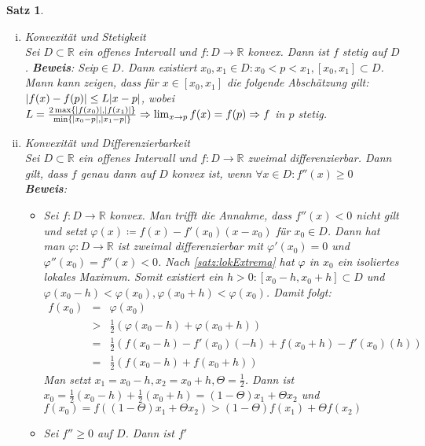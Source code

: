 \documentclass[ngerman,titlepage,twoside, parskip=half*]{scrreprt}
\newcommand*{\R}{\mathbb{R}}
\theoremstyle{break}
\newtheorem{theorem}{Satz}[section]
\theoremstyle{nonumberbreak}
\DeclarePairedDelimiter{\abs}{\lvert}{\rvert}
\begin{document}
\begin{theorem}
  \begin{enumerate}[(i)]
    \item \textit{Konvexität und Stetigkeit}\\
      Sei $D\subset\R$ ein offenes Intervall und $f\colon D\rightarrow\R$
      konvex. Dann ist $f$ stetig auf $D$.
      \textbf{Beweis}: Sei$p\in D$. Dann existiert $x_0,x_1\in D\colon
      x_0<p<x_1, [x_0,x_1]\subset D$. Mann kann zeigen, dass für
      $x\in[x_0,x_1]$ die folgende Abschätzung gilt:\\
      $\abs{f(x)-f(p)}\leq L\abs{x-p}$, wobei $L=
      \frac{2\max\{\abs{f(x_0)},\abs{f(x_1)}\}}{\min\{\abs{x_0-p},\abs{x_1-p}\}}
      \Rightarrow\lim_{x\rightarrow p} f(x)=f(p)\Rightarrow f$ in $p$
      stetig.
    \item \textit{Konvexität und Differenzierbarkeit}\\
      Sei $D\subset\R$ ein offenes Intervall und $f\colon D\rightarrow\R$
      zweimal differenzierbar. Dann gilt, dass $f$ genau dann auf $D$
      konvex ist, wenn $\forall x\in D\colon f''(x)\geq 0$\\
      \textbf{Beweis}: \begin{itemize}
	\item["`$\Rightarrow$"'] Sei $f\colon D\rightarrow\R$ konvex. Man
	  trifft die Annahme, dass $f''(x)<0$ \emph{nicht} gilt und
	  setzt $\varphi(x)\coloneqq f(x)-f'(x_0)(x-x_0)$ für $x_0\in D$. Dann
	  hat man $\varphi\colon D\rightarrow\R$ ist zweimal differenzierbar
	  mit $\varphi'(x_0)=0$ und $\varphi''(x_0)=f''(x)<0$. Nach
	  \autoref{satz:lokExtrema} hat $\varphi$ in $x_0$ ein
	  isoliertes lokales Maximum. Somit existiert ein $h>0\colon
	  [x_0-h,x_0+h]\subset D$ und $\varphi(x_0-h)<\varphi(x_0),
	  \varphi(x_0+h)<\varphi(x_0)$. Damit folgt:
	  \begin{align*}
	    f(x_0)&=& \varphi(x_0)\\
	    &>& \frac{1}{2}(\varphi(x_0-h)+\varphi(x_0+h))\\
	    &=& \frac{1}{2}(f(x_0-h)-f'(x_0)(-h)+f(x_0+h)-f'(x_0)(h))\\
	    &=& \frac{1}{2}(f(x_0-h)+f(x_0+h))
	  \end{align*}
	  Man setzt $x_1=x_0-h, x_2=x_0+h, \Theta=\frac{1}{2}$. Dann ist
	  $x_0=\frac{1}{2}(x_0-h)+\frac{1}{2}(x_0+h)=(1-\Theta)x_1+
	  \Theta x_2$ und $f(x_0)=f( (1-\Theta)x_1+\Theta x_2)>(1-\Theta)
	  f(x_1)+\Theta f(x_2)$\textnormal{\lightning}
	\item["`$\Leftarrow$"'] Sei $f''\geq 0$ auf $D$. Dann ist $f'$

\end{itemize}
\end{enumerate}
\end{theorem}
\end{document}
